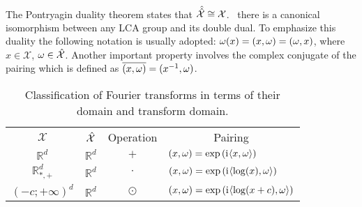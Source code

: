 \paragraph{}
The Pontryagin duality theorem states that $\hat{\hat{\mathcal{X}}}\cong \mathcal{X}$. \Ie~there is a canonical isomorphism between any \acs{LCA} group and its double dual. To emphasize this duality the following notation is usually adopted: $\omega(x)=(x,\omega)=(\omega,x)$, where $x\in\mathcal{X}$, $\omega\in\hat{\mathcal{X}}$. Another important property involves the complex conjugate of the pairing which is defined as $\overline{(x,\omega)} = ({x}^{-1},\omega)$.
\begin{table}[!ht]\label{table:pairings}
\caption{Classification of Fourier transforms in terms of their domain and transform domain.}
\label{tab:dual_and_pairing}
\centering
\begin{tabularx}{\textwidth}{cccX}
\toprule
\multicolumn{1}{c}{$\mathcal{X}$} & \multicolumn{1}{c}{$\hat{\mathcal{X}}$} & \multicolumn{1}{c}{Operation} & \multicolumn{1}{c}{Pairing} \\
\cmidrule{1-4}
$\mathbb{R}^d$ & $\mathbb{R}^d$ & $+$ & $(x,\omega) = \exp\left({\mathrm{i}\mkern1mu} \langle x, \omega\rangle\right)$ \\
$\mathbb{R}^d_{*,+}$ & $\mathbb{R}^d$ & $\cdot$ & $(x,\omega) =\exp\left( {\mathrm{i}\mkern1mu} \langle\log(x), \omega\rangle \right)$ \\
$(-c;+\infty)^d$ & $\mathbb{R}^d$ & $\odot$ & $(x,\omega) =\exp\left( {\mathrm{i}\mkern1mu} \langle\log(x+c), \omega\rangle \right)$ \\
\bottomrule
\end{tabularx}
\end{table}

